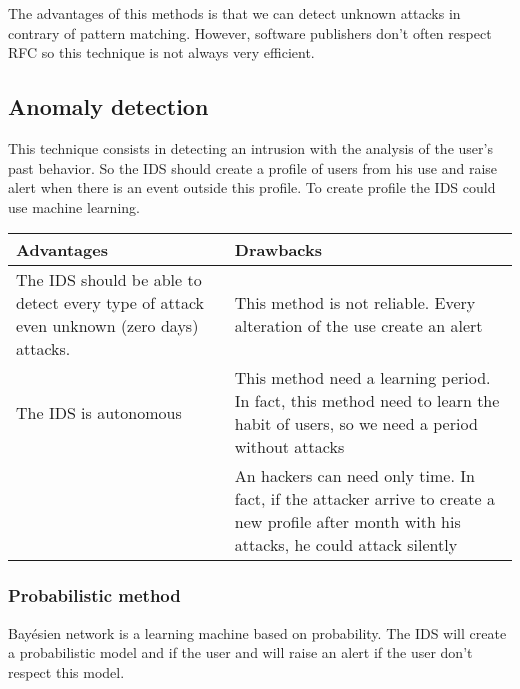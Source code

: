 The advantages of this methods is that we can detect unknown attacks in contrary of pattern matching. However,
software publishers don't often respect RFC so this technique is not always very efficient.





\subsection{Anomaly detection}

This technique consists in detecting an intrusion with the analysis of the user's past behavior. So the IDS should
create a profile of users from his use and raise alert when there is an event outside this profile. To create
profile the IDS could use machine learning.
~\\

\begin{tabular}{|p{}|p{}|} \hline
Advantages                                                                                                 & Drawbacks \\ \hline The IDS should be able to detect every type of
attack even unknown (zero days) attacks.                                                                   & This method is not reliable. Every
alteration of the use create an alert                                                                                  \\
  \hline The IDS is autonomous                                                                             & This method
need a learning period. In fact, this method need to learn the habit of users,
so we need a period without attacks                                                                                    \\ \hline & An hackers can need only time. In fact,
if the attacker arrive to create a new profile after month with his attacks, he
could attack silently                                                                                                  \\ \hline

\end{tabular}


\subsubsection{Probabilistic method}
Bayésien network is a learning machine based on probability. The IDS will create a probabilistic model and if the
user and will raise an alert if the user don't respect this model.

